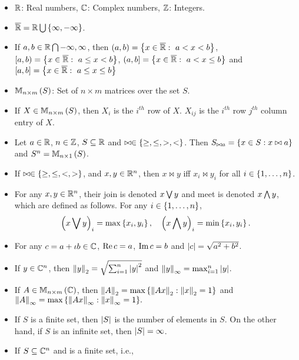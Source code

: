 
\begin{itemize}
\item $\mathbb{R}$: Real numbers, $\mathbb{C}$: Complex numbers,
  $\mathbb{Z}$: Integers.
\item $\overline{\mathbb{R}}=\mathbb{R}\bigcup\left\{\infty,-\infty\right\}$.
\item If $a,b\in\mathbb{R}\bigcap{-\infty,\infty}$, then
  $(a,b)=\left\{x\in\overline{\mathbb{R}}:~a< x< b\right\}$,\\
  $[a,b)=\left\{x\in\overline{\mathbb{R}}:~a\leq x< b\right\}$,
  $(a,b]=\left\{x\in\overline{\mathbb{R}}:~a< x\leq b\right\}$ and\\
  $[a,b]=\left\{x\in\overline{\mathbb{R}}:~a\leq x\leq b\right\}$
\item $\mathbb{M}_{n\times m}\left(S\right)$: Set of $n\times m$ matrices over the set $S$.
\item If $X\in\mathbb{M}_{n\times m}\left(S\right)$, then $X_i$ is the $i^{th}$ row of $X$.
  $X_{ij}$ is the $i^{th}$ row $j^{th}$ column entry of $X$.
\item Let $a\in\mathbb{R}$, $n\in\mathbb{Z}$, $S\subseteq\mathbb{R}$ and
  $\bowtie\in\left\{\geq,\leq,>,<\right\}$.  Then $S_{\bowtie a}=\left\{x\in S:
  x\bowtie a\right\}$ and $S^n=\mathbb{M}_{n\times1}\left(S\right)$.
\item If $\bowtie\in\left\{\geq,\leq,<,>\right\}$, and $x,y\in\mathbb{R}^n$, then
  $x\bowtie y$ iff $x_i\bowtie y_i$ for all $i\in\left\{1,\ldots,n\right\}$.
\item For any $x,y\in\mathbb{R}^n$, their join is denoted $x\bigvee y$ and meet
  is denoted $x\bigwedge y$, which are defined as follows.  For any $i\in\left\{1,\ldots,n\right\}$,
  \[
\left(x\bigvee y\right)_i=\max\left\{x_i,y_i\right\},~~~\left(x\bigwedge y\right)_i=\min\left\{x_i,y_i\right\}.
  \]
\item For any $c=a+\iota b\in\mathbb{C}$, $\operatorname{Re}{c}=a$, $\operatorname{Im}{c}=b$ and
  $\left|c\right|=\sqrt{a^2+b^2}$.
\item  If $y\in\mathbb{C}^n$, then
  $\left\|y\right\|_2=\sqrt{\sum_{i=1}^n{\left|y\right|}^2}$ and
  $\left\|y\right\|_{\infty}=\max_{i=1}^n\left|y\right|$.
\item If $A\in\mathbb{M}_{n\times m}\left(\mathbb{C}\right)$, then
  $\left\|A\right\|_2=\max\left\{\left\|Ax\right\|_2:\left\|x\right\|_2=1\right\}$
  and\\ ${\left\|A\right\|_{\infty}=\max\left\{\left\|Ax\right\|_{\infty}:\left\|x\right\|_{\infty}=1\right\}}.$
\item  If $S$ is a finite set, then $\left|S\right|$ is the number of
  elements in $S$.  On the other hand, if $S$ is an infinite set, then
  $\left|S\right|=\infty$.
\item If $S\subseteq\mathbb{C}^n$ and is a finite set, i.e.,

\end{itemize}
